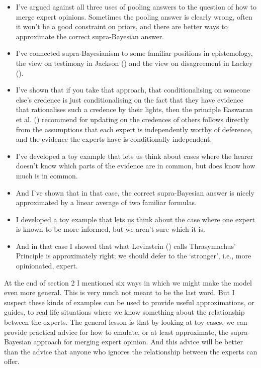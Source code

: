 \documentclass[
  11pt,
  letterpaper,
  DIV=11,
  numbers=noendperiod,
  twoside]{scrartcl}
\providecommand{\tightlist}{%
  \setlength{\itemsep}{0pt}\setlength{\parskip}{0pt}}
\begin{document}
\begin{itemize}
\tightlist
\item
  I've argued against all three uses of pooling answers to the question
  of how to merge expert opinions. Sometimes the pooling answer is
  clearly wrong, often it won't be a good constraint on priors, and
  there are better ways to approximate the correct supra-Bayesian
  answer.
\item
  I've connected supra-Bayesianism to some familiar positions in
  epistemology, the view on testimony in Jackson
  () and the view on disagreement in
  Lackey ().
\item
  I've shown that if you take that approach, that conditionalising on
  someone else's credence is just conditionalising on the fact that they
  have evidence that rationalises such a credence by their lights, then
  the principle Easwaran et al. ()
  recommend for updating on the credences of others follows directly
  from the assumptions that each expert is independently worthy of
  deference, and the evidence the experts have is conditionally
  independent.
\item
  I've developed a toy example that lets us think about cases where the
  hearer doesn't know which parts of the evidence are in common, but
  does know how much is in common.
\item
  And I've shown that in that case, the correct supra-Bayesian answer is
  nicely approximated by a linear average of two familiar formulas.
\item
  I developed a toy example that lets us think about the case where one
  expert is known to be more informed, but we aren't sure which it is.
\item
  And in that case I showed that what Levinstein
  () calls Thrasymachus' Principle is
  approximately right; we should defer to the `stronger', i.e., more
  opinionated, expert.
\end{itemize}

At the end of section 2 I mentioned six ways in which we might make the
model even more general. This is very much not meant to be the last
word. But I suspect these kinds of examples can be used to provide
useful approximations, or guides, to real life situations where we know
something about the relationship between the experts. The general lesson
is that by looking at toy cases, we can provide practical advice for how
to emulate, or at least approximate, the supra-Bayesian approach for
merging expert opinion. And this advice will be better than the advice
that anyone who ignores the relationship between the experts can offer.
\end{document}
